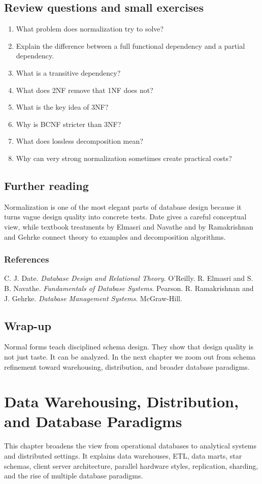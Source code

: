 \documentclass[11pt,a4paper,openany]{book}
\makeatletter
\renewenvironment{thebibliography}[1]
 {\subsection*{References}%
  \list{\@biblabel{\@arabic\c@enumiv}}%
   {\settowidth\labelwidth{\@biblabel{#1}}%
    \leftmargin\labelwidth\advance\leftmargin\labelsep
    \usecounter{enumiv}\let\p@enumiv\@empty
    \renewcommand\theenumiv{\@arabic\c@enumiv}}%
  \sloppy\clubpenalty4000\widowpenalty4000}
 {\endlist}
\makeatother
\begin{document}
\section{Review questions and small exercises}
\begin{enumerate}
\item What problem does normalization try to solve?
\item Explain the difference between a full functional dependency and a partial dependency.
\item What is a transitive dependency?
\item What does 2NF remove that 1NF does not?
\item What is the key idea of 3NF?
\item Why is BCNF stricter than 3NF?
\item What does lossless decomposition mean?
\item Why can very strong normalization sometimes create practical costs?
\end{enumerate}

\section{Further reading}
Normalization is one of the most elegant parts of database design because it turns vague design quality into concrete tests. Date gives a careful conceptual view, while textbook treatments by Elmasri and Navathe and by Ramakrishnan and Gehrke connect theory to examples and decomposition algorithms.

\begin{thebibliography}{9}
C. J. Date.
\textit{Database Design and Relational Theory}. O'Reilly.
R. Elmasri and S. B. Navathe.
\textit{Fundamentals of Database Systems}. Pearson.
R. Ramakrishnan and J. Gehrke.
\textit{Database Management Systems}. McGraw-Hill.
\end{thebibliography}

\section{Wrap-up}
Normal forms teach disciplined schema design. They show that design quality is not just taste. It can be analyzed. In the next chapter we zoom out from schema refinement toward warehousing, distribution, and broader database paradigms.

\chapter{Data Warehousing, Distribution, and Database Paradigms}
\begin{guidancebox}
This chapter broadens the view from operational databases to analytical systems and distributed settings. It explains data warehouses, ETL, data marts, star schemas, client server architecture, parallel hardware styles, replication, sharding, and the rise of multiple database paradigms.
\end{guidancebox}
\end{document}
